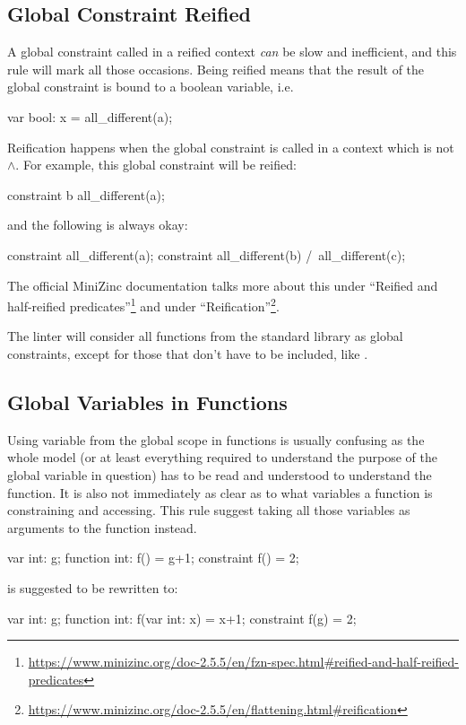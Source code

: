 \documentclass[a4paper,12pt]{article}
\newcommand{\mi}[1]{\mbox{\mzninline{#1}}}
\begin{document}
\subsection{Global Constraint Reified}\label{sec:rule:reifiedglobal}
A global constraint called in a reified context \emph{can} be slow and inefficient,
and this rule will mark all those occasions. Being reified means that the result of the global
constraint is bound to a boolean variable, i.e.\@
\begin{mznnobreak}
var bool: x = all_different(a);
\end{mznnobreak}
Reification happens when the global constraint is called in a context which is not $\land$.
For example, this global constraint will be reified:
\begin{mznnobreak}
constraint b \/ all_different(a);
\end{mznnobreak}
and the following is always okay:
\begin{mznnobreak}
constraint all_different(a);
constraint all_different(b) /\ all_different(c);
\end{mznnobreak}
The official MiniZinc documentation talks more about this under ``Reified and half-reified
predicates''\footnote{\url{https://www.minizinc.org/doc-2.5.5/en/fzn-spec.html\#reified-and-half-reified-predicates}}
and under ``Reification''\footnote{\url{https://www.minizinc.org/doc-2.5.5/en/flattening.html\#reification}}.

The linter will consider all functions from the standard library as global constraints,
except for those that don't have to be included, like \mi{forall}.

\subsection{Global Variables in Functions}\label{sec:rule:globalfun}
Using variable from the global scope in functions is usually confusing as the whole model
(or at least everything required to understand the purpose of the global variable in
question) has to be read and understood to understand the function. It is also not
immediately as clear as to what variables a function is constraining and accessing. This rule
suggest taking all those variables as arguments to the function instead.

\begin{mznnobreak}
var int: g;
function int: f() = g+1;
constraint f() = 2;
\end{mznnobreak}
is suggested to be rewritten to:
\begin{mznnobreak}
var int: g;
function int: f(var int: x) = x+1;
constraint f(g) = 2;
\end{mznnobreak}
\end{document}
